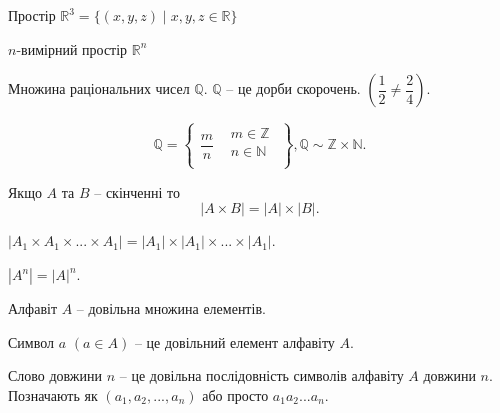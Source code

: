 \begin{example}
    Простір $\mathbb{R}^3 = \{(x, y, z) \mid x, y, z \in \mathbb{R}\}$
\end{example}

\begin{example}
    $n$-вимірний простір $\mathbb{R}^n$
\end{example}

\begin{example}
    Множина раціональних чисел $\mathbb{Q}$. $\mathbb{Q}$ -- це дорби скорочень. $\left(\dfrac{1}{2} \neq \dfrac{2}{4}\right)$.
    
    \begin{equation*}
        \mathbb{Q} = \left\{ \begin{array}{c|c}
            \dfrac{m}{n}
            &\begin{matrix}
                m \in \mathbb{Z} \\
                n \in \mathbb{N} \\
            \end{matrix}
        \end{array} \right\},
        \mathbb{Q} \sim \mathbb{Z} \times \mathbb{N}.
    \end{equation*}
\end{example}

\begin{theorem}
    Якщо $A$ та $B$ -- скінченні то
    $$|A \times B| = |A| \times |B|.$$
\end{theorem}

\begin{corollary}
    $|A_1 \times A_1 \times ... \times A_1| = |A_1| \times |A_1| \times ... \times |A_1|.$
\end{corollary}

\begin{corollary}
    $|A^n| = |A|^n.$
\end{corollary}

\begin{definition}[Алфавіт]
    Алфавіт $A$ -- довільна множина елементів.
\end{definition}

\begin{definition}[Символ]
    Символ $a$ $(a \in A)$ -- це довільний елемент алфавіту $A$.
\end{definition}

\begin{definition}[Слово]
   Слово довжини $n$ -- це довільна послідовність символів алфавіту $A$ довжини $n$. Позначають як $(a_1, a_2, ..., a_n)$ або просто $a_1a_2...a_n$.
\end{definition}

